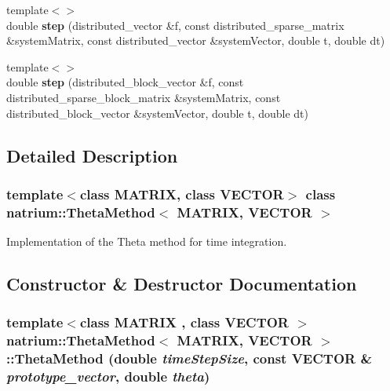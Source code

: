 \begin{DoxyCompactItemize}
\item 
\hypertarget{classnatrium_1_1ThetaMethod_a68e1ddc84cd0ae5ee13a26333a9b5b97}{
{\footnotesize template$<$$>$ }\\double {\bfseries step} (distributed\_\-vector \&f, const distributed\_\-sparse\_\-matrix \&systemMatrix, const distributed\_\-vector \&systemVector, double t, double dt)}
\label{classnatrium_1_1ThetaMethod_a68e1ddc84cd0ae5ee13a26333a9b5b97}

\item 
\hypertarget{classnatrium_1_1ThetaMethod_a09182df9e98932d93b7e32ffdd2ae46f}{
{\footnotesize template$<$$>$ }\\double {\bfseries step} (distributed\_\-block\_\-vector \&f, const distributed\_\-sparse\_\-block\_\-matrix \&systemMatrix, const distributed\_\-block\_\-vector \&systemVector, double t, double dt)}
\label{classnatrium_1_1ThetaMethod_a09182df9e98932d93b7e32ffdd2ae46f}

\end{DoxyCompactItemize}


\subsection{Detailed Description}
\subsubsection*{template$<$class MATRIX, class VECTOR$>$ class natrium::ThetaMethod$<$ MATRIX, VECTOR $>$}

Implementation of the Theta method for time integration. 

\subsection{Constructor \& Destructor Documentation}
\hypertarget{classnatrium_1_1ThetaMethod_a7b5ec1aa8b646768c45cc422651ec905}{
\subsubsection[{ThetaMethod}]{\setlength{\rightskip}{0pt plus 5cm}template$<$class MATRIX , class VECTOR $>$ {\bf natrium::ThetaMethod}$<$ MATRIX, VECTOR $>$::{\bf ThetaMethod} (double {\em timeStepSize}, \/  const VECTOR \& {\em prototype\_\-vector}, \/  double {\em theta})}}
\label{classnatrium_1_1ThetaMethod_a7b5ec1aa8b646768c45cc422651ec905}


